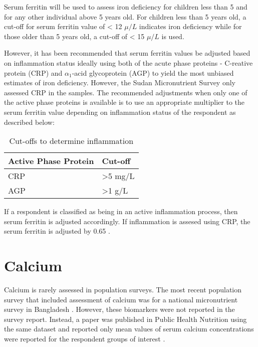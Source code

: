 \documentclass[12pt,a4paper]{article}
\begin{document}
Serum ferritin will be used to assess iron deficiency for children less than 5 and for any other individual above 5 years old. For children less than 5 years old, a cut-off for serum ferritin value of \textless{} 12 \(\mu/L\) indicates iron deficiency while for those older than 5 years old, a cut-off of \textless{} 15 \(\mu/L\) is used.

However, it has been recommended that serum ferritin values be adjusted based on inflammation status ideally using both of the acute phase proteins - C-reative protein (CRP) and \(\alpha_1\)-acid glycoprotein (AGP) to yield the most unbiased estimates of iron deficiency. However, the Sudan Micronutrient Survey only assessed CRP in the samples. The recommended adjustments when only one of the active phase proteins is available is to use an appropriate multiplier to the serum ferritin value depending on inflammation status of the respondent as described below:

\begin{table}[H]

\caption{\label{tab:inflammation}Cut-offs to determine inflammation}
\centering
\begin{tabular}[t]{ll}
\toprule
\textbf{Active Phase Protein} & \textbf{Cut-off}\\
\midrule
\rowcolor{gray!6}  CRP & >5 mg/L\\
AGP & >1 g/L\\
\bottomrule
\end{tabular}
\end{table}

If a respondent is classified as being in an active inflammation process, then serum ferritin is adjusted accordingly. If inflammation is assesed using CRP, the serum ferritin is adjusted by 0.65 \citep{Thurnham:2010he}.

\hypertarget{calcium}{%
\section{Calcium}\label{calcium}}

Calcium is rarely assessed in population surveys. The most recent population survey that included assessment of calcium was for a national micronutrient survey in Bangladesh \citep{icddr:2013tx}. However, these biomarkers were not reported in the survey report. Instead, a paper was published in Public Health Nutrition using the same dataset and reported only mean values of serum calcium concentrations were reported for the respondent groups of interest \citep{Bromage:2016kv}.
\end{document}
